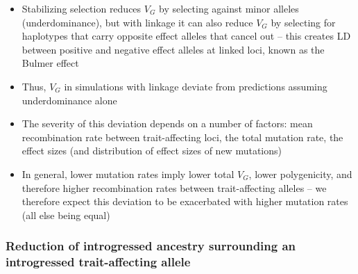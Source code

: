 \documentclass{article}
\begin{document}
\begin{itemize}
    \item Stabilizing selection reduces $V_G$ by selecting against minor alleles
        (underdominance), but with linkage it can also reduce $V_G$ by selecting
        for haplotypes that carry opposite effect alleles that cancel out -- this
        creates LD between positive and negative effect alleles at linked loci,
        known as the Bulmer effect \citep{}
    \item Thus, $V_G$ in simulations with linkage deviate from predictions
        assuming underdominance alone
    \item The severity of this deviation depends on a number of factors: mean
        recombination rate between trait-affecting loci, the total mutation rate,
        the effect sizes (and distribution of effect sizes of new mutations)
    \item In general, lower mutation rates imply lower total $V_G$, lower polygenicity,
        and therefore higher recombination rates between trait-affecting alleles --
        we therefore expect this deviation to be exacerbated with higher mutation
        rates (all else being equal)
\end{itemize}

\subsubsection*{Reduction of introgressed ancestry surrounding an introgressed trait-affecting allele}
\end{document}
